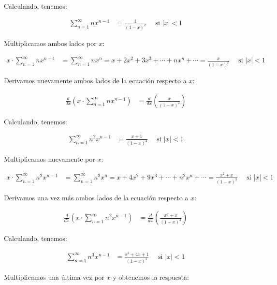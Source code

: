 \documentclass{article}
\begin{document}
    Calculando, tenemos:

    \begin{align*}
        \sum_{n=1}^{\infty} nx^{n-1} &= \frac{1}{(1-x)^2} \quad \text{ si } |x| < 1
    \end{align*}

    Multiplicamos ambos lados por \(x\):

    \begin{align*}
        x \cdot \sum_{n=1}^{\infty} n x^{n-1} &= \sum_{n=1}^{\infty} n x^{n} = x + 2x^2 + 3x^3 + \cdots + nx^n + \cdots = \frac{x}{(1-x)^2} \quad \text{ si } |x| < 1
    \end{align*}

    Derivamos nuevamente ambos lados de la ecuación respecto a \(x\):

    \begin{align*}
        \frac{d}{dx} \left( x \cdot \sum_{n=1}^{\infty} nx^{n-1} \right) &= \frac{d}{dx} \left( \frac{x}{(1-x)^2} \right)
    \end{align*}

    Calculando, tenemos:

    \begin{align*}
        \sum_{n=1}^{\infty} n^2 x^{n-1} &= \frac{x + 1}{(1-x)^3} \quad \text{ si } |x| < 1
    \end{align*}

    Multiplicamos nuevamente por \(x\):

    \begin{align*}
        x \cdot \sum_{n=1}^{\infty} n^2 x^{n-1} &= \sum_{n=1}^{\infty} n^2 x^{n} = x + 4x^2 + 9x^3 + \cdots + n^2 x^n + \cdots = \frac{x^2 + x}{(1-x)^3} \quad \text{ si } |x| < 1
    \end{align*}

    Derivamos una vez más ambos lados de la ecuación respecto a \(x\):

    \begin{align*}
        \frac{d}{dx} \left( x \cdot \sum_{n=1}^{\infty} n^2 x^{n-1} \right) &= \frac{d}{dx} \left( \frac{x^2 + x}{(1-x)^3} \right)
    \end{align*}

    Calculando, tenemos:

    \begin{align*}
        \sum_{n=1}^{\infty} n^3 x^{n-1} &= \frac{x^2 + 4x + 1}{(1-x)^4} \quad \text{ si } |x| < 1
    \end{align*}

    Multiplicamos una última vez por \(x\) y obtenemos la respuesta:
\end{document}
